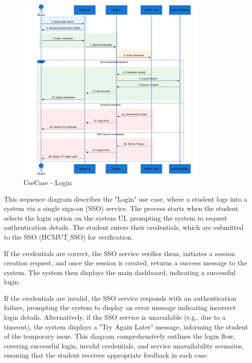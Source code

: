 \vspace{1cm}

\begin{figure}[H]
    \vspace{-0.5cm}
    \centering
    \includegraphics[width=0.85\textwidth]{images/sequence_diagram/Login.png}
    \caption{UseCase - Login}
    \label{fig:login}
\end{figure}


This sequence diagram describes the "Login" use case, where a student logs into a system via a single sign-on (SSO) service. The process starts when the student selects the login option on the system UI, prompting the system to request authentication details. The student enters their credentials, which are submitted to the SSO (HCMUT$\_$SSO) for verification.

If the credentials are correct, the SSO service verifies them, initiates a session creation request, and once the session is created, returns a success message to the system. The system then displays the main dashboard, indicating a successful login.

If the credentials are invalid, the SSO service responds with an authentication failure, prompting the system to display an error message indicating incorrect login details. Alternatively, if the SSO service is unavailable (e.g., due to a timeout), the system displays a "Try Again Later" message, informing the student of the temporary issue. This diagram comprehensively outlines the login flow, covering successful login, invalid credentials, and service unavailability scenarios, ensuring that the student receives appropriate feedback in each case.

